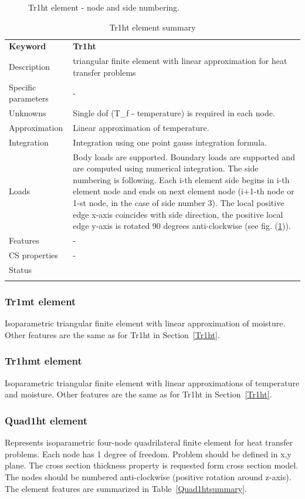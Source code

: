\documentclass[a4paper]{article}
\newcommand{\param}[1]{\texttt{#1}} %
\newcommand{\templabel}{}%
\newcommand{\tempcaption}{}%
\newcounter{nelpar}
\newenvironment{elementsummary}[5]{%
  \gdef\tempcaption{#4}%
  \gdef\templabel{#5}%
  \setcounter{nelpar}{0}%
  \begin{center} %
    \begin{table}[!htb] %
      \begin{tabular}{|l|p{9cm}|}\hline %
        {\bf Keyword} & \bf{#1}\\ %
        {Description} & {#2}\\ %
        {Specific parameters} & {#3}\\ \hline %
}{
  \\ \hline %
      \end{tabular}%
      \caption{\tempcaption}%
      \label{\templabel}%
    \end{table}%
  \end{center}%
}
\newcommand{\elementParam}[1]{%
  \ifthenelse{\value{nelpar}>0} %
             {&{#1}}%
             {\setcounter{nelpar}{1}Parameters&{#1}}%
             \\%
}
\newcommand{\elementDescription}[2]{{#1} & {#2}\\}
\begin{document}
\begin{figure}[htb]
 \centering
 \begin{makeimage}
  
 \end{makeimage}
 \caption{Tr1ht element - node and side numbering.}
 \label{Tr1htfig}
\end{figure}

\begin{elementsummary}{Tr1ht}{triangular finite element with linear approximation for heat transfer problems}{-}{Tr1ht element summary}{Tr1htsummary}
\elementDescription{Unknowns}{Single dof (T\_f - temperature) is required in each node.}
\elementDescription{Approximation}{Linear approximation of temperature.}
\elementDescription{Integration}{Integration using one point gauss integration formula.}
\elementDescription{Loads}{Body loads are supported. Boundary loads are
supported and are computed  using numerical integration. The side numbering is
following. Each i-th element side begins in i-th element node and
ends on next element node (i+1-th node or 1-st node, in the case of 
side number 3). The local positive edge x-axis coincides with side
direction, the positive local edge y-axis is rotated 90 degrees
anti-clockwise (see fig. (\ref{Tr1htfig})).}
\elementDescription{Features}{-}
\elementDescription{CS properties}{-}
\elementDescription{Status}{}
\end{elementsummary}

\subsubsection{Tr1mt element}
Isoparametric triangular finite element with linear approximation of moisture.
Other features are the same as for Tr1ht in Section~\ref{Tr1ht}.

\subsubsection{Tr1hmt element}
Isoparametric triangular finite element with linear approximations of 
temperature and moisture. 
Other features are the same as for Tr1ht in Section~\ref{Tr1ht}.


\subsubsection{Quad1ht element}
\label{Quad1ht}
Represents isoparametric four-node quadrilateral finite element for
heat transfer problems. Each node has 1 degree of freedom.
Problem should be defined in x,y plane. The cross section thickness
property is requested form cross section model.
The nodes should be numbered anti-clockwise (positive rotation around
z-axis). The element features are summarized in Table~\ref{Quad1htsummary}.
\end{document}
